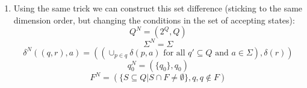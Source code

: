 \begin{enumerate}
\begin{enumerate}
      \item
        Using the same trick we can construct this set difference (sticking to the same dimension order, but changing the conditions in the set of accepting states):
        $$Q^N = (2^Q, Q)$$
        $$\Sigma^N = \Sigma$$
        $$\delta^N((q,r), a) = ( (\cup_{p \in q}\delta(p,a) \text{ for all } q' \subseteq Q \text { and } a \in \Sigma), \delta(r) )$$
        $$q_0^N = (\{q_0\}, q_0)$$
        $$F^N = ( \{S \subseteq Q | S \cap F \neq \emptyset \}, q, q \notin F)$$

  \end{enumerate}
  
\end{enumerate}
